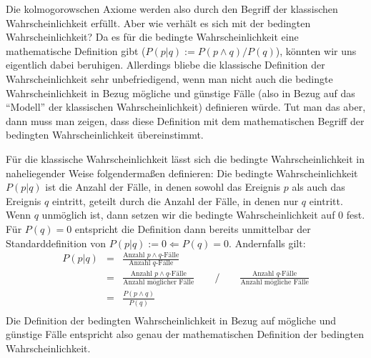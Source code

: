 Die kolmogorowschen Axiome werden also durch den Begriff der klassischen
Wahrscheinlichkeit erfüllt. Aber wie verhält es sich mit der bedingten
Wahrscheinlichkeit? Da es für die bedingte Wahrscheinlichkeit eine
mathematische Definition gibt ($P(p|q) := P(p \wedge q)/P(q)$), könnten wir uns
eigentlich dabei beruhigen. Allerdings bliebe die klassische Definition der
Wahrscheinlichkeit sehr unbefriedigend, wenn man nicht auch die bedingte
Wahrscheinlichkeit in Bezug mögliche und günstige Fälle (also in Bezug auf das
"`Modell"' der klassischen Wahrscheinlichkeit) definieren würde. Tut man das
aber, dann muss man zeigen, dass diese Definition mit dem mathematischen
Begriff der bedingten Wahrscheinlichkeit übereinstimmt. 

Für die klassische Wahrscheinlichkeit lässt sich die bedingte
Wahrscheinlichkeit in naheliegender Weise folgendermaßen definieren:
Die bedingte Wahrscheinlichkeit $P(p|q)$ ist die Anzahl der Fälle, in denen
sowohl das Ereignis $p$ als auch das Ereignis $q$ eintritt, geteilt durch die
Anzahl der Fälle, in denen nur $q$ eintritt. Wenn $q$ unmöglich ist, dann
setzen wir die bedingte Wahrscheinlichkeit auf 0 fest. Für $P(q)=0$ entspricht
die Definition dann bereits unmittelbar der Standarddefinition von $P(p|q) := 0
\Leftarrow P(q) = 0$. Andernfalls gilt: 
\begin{eqnarray*}
P(p|q) & = & \frac{\mbox{Anzahl } p \wedge q\mbox{-Fälle}}
                  {\mbox{Anzahl } q\mbox{-Fälle}} \\
{ }    & = & \frac{\mbox{Anzahl } p \wedge q\mbox{-Fälle}}
                  {\mbox{Anzahl möglicher Fälle}} \qquad / \qquad
                  \frac{\mbox{Anzahl }q\mbox{-Fälle}}
                  {\mbox{Anzahl mögliche Fälle}} \\ { }    
{ }    & = & \frac{P(p \wedge q)}{P(q)} \\
\end{eqnarray*}
Die Definition der bedingten Wahrscheinlichkeit in Bezug auf mögliche und
günstige Fälle entspricht also genau der mathematischen Definition der bedingten
Wahrscheinlichkeit.

